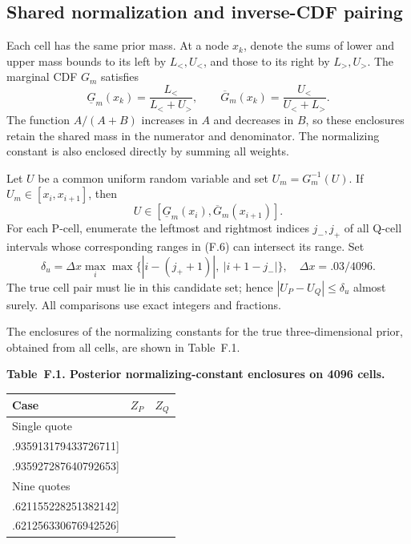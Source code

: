 \documentclass[11pt,a4paper]{article}
\begin{document}
\subsection{Shared normalization and inverse-CDF pairing}

Each cell has the same prior mass.
At a node \(x_k\), denote the sums of lower and upper mass bounds to its left by
\(L_<,U_<\), and those to its right by \(L_>,U_>\).
The marginal CDF \(G_m\) satisfies
\[
\underline G_m(x_k)=\frac{L_<}{L_<+U_>},
\qquad
\overline G_m(x_k)=\frac{U_<}{U_<+L_>}.
\tag{F.5}
\]
The function \(A/(A+B)\) increases in \(A\) and decreases in \(B\), so these
enclosures retain the shared mass in the numerator and denominator.
The normalizing constant is also enclosed directly by summing all weights.

Let \(U\) be a common uniform random variable and set \(U_m=G_m^{-1}(U)\).
If \(U_m\in[x_i,x_{i+1}]\), then
\[
U\in[\underline G_m(x_i),\overline G_m(x_{i+1})].
\tag{F.6}
\]
For each P-cell, enumerate the leftmost and rightmost indices \(j_-,j_+\) of all
Q-cell intervals whose corresponding ranges in (F.6) can intersect its range.
Set
\[
\delta_u=\Delta x\max_i\max\{|i-(j_++1)|,\ |i+1-j_-|\},
\quad \Delta x=.03/4096.
\tag{F.7}
\]
The true cell pair must lie in this candidate set; hence
\(|U_P-U_Q|\le\delta_u\) almost surely.
All comparisons use exact integers and fractions.

The enclosures of the normalizing constants for the true three-dimensional prior,
obtained from all cells, are shown in Table~F.1.

\noindent\textbf{Table~F.1. Posterior normalizing-constant enclosures on 4096 cells.}
\begin{center}
\begin{tabularx}{\textwidth}{@{}l X X@{}}
\toprule
Case & \(Z_P\) & \(Z_Q\) \\
\midrule
Single quote &
\(\begin{gathered}[c] [.935743002637584884,\\ .935913179433726711]\end{gathered}\) &
\(\begin{gathered}[c] [.935667223967444023,\\ .935927287640792653]\end{gathered}\) \\
\addlinespace
Nine quotes &
\(\begin{gathered}[c] [.620128921272339539,\\ .621155228251382142]\end{gathered}\) &
\(\begin{gathered}[c] [.619743550733119263,\\ .621256330676942526]\end{gathered}\) \\
\bottomrule
\end{tabularx}
\end{center}
\end{document}
